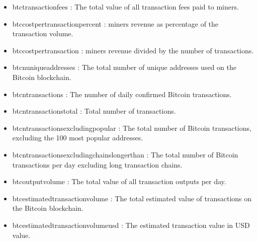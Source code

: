 \documentclass{article}
\begin{document}
\begin{itemize}
\item btc\textunderscore transaction\textunderscore fees : The total value of all transaction fees paid to miners.

\item btc\textunderscore cost\textunderscore per\textunderscore transaction\textunderscore percent : miners revenue as percentage of the transaction volume.

\item btc\textunderscore cost\textunderscore per\textunderscore transaction : miners revenue divided by the number of transactions.

\item btc\textunderscore n\textunderscore unique\textunderscore addresses : The total number of unique addresses used on the Bitcoin blockchain.

\item btc\textunderscore n\textunderscore transactions : The number of daily confirmed Bitcoin transactions.

\item btc\textunderscore n\textunderscore transactions\textunderscore total : Total number of transactions.

\item btc\textunderscore n\textunderscore transactions\textunderscore excluding\textunderscore popular : The total number of Bitcoin transactions, excluding the 100 most popular addresses.

\item btc\textunderscore n\textunderscore transactions\textunderscore excluding\textunderscore chains\textunderscore longer\textunderscore than : The total number of Bitcoin transactions per day excluding long transaction chains.

\item btc\textunderscore output\textunderscore volume : The total value of all transaction outputs per day.

\item btc\textunderscore estimated\textunderscore transaction\textunderscore volume : The total estimated value of transactions on the Bitcoin blockchain.

\item btc\textunderscore estimated\textunderscore transaction\textunderscore volume\textunderscore usd : The estimated transaction value in USD value.

\end{itemize}
\end{document}
